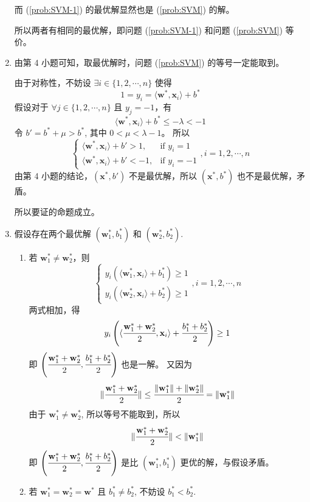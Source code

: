 \documentclass[11pt,letter,notitlepage]{article}
\begin{document}
\begin{solution}
\begin{enumerate}
		      而 (\ref{prob:SVM-1}) 的最优解显然也是 (\ref{prob:SVM}) 的解。

		      所以两者有相同的最优解，即问题 (\ref{prob:SVM-1}) 和问题 (\ref{prob:SVM}) 等价。
		\item 由第 4 小题可知，取最优解时，问题 (\ref{prob:SVM}) 的等号一定能取到。

		      由于对称性，不妨设 $\exists i \in \{1,2,\cdots,n\}$ 使得
		      $$1=y_i=\langle \mathbf{w}^*, \mathbf{x}_i \rangle+b^*$$
		      假设对于 $\forall j \in \{1,2,\cdots,n\}$ 且 $y_j=-1$，有
		      $$\langle \mathbf{w}^*, \mathbf{x}_i \rangle+b^* \leq -\lambda < -1$$
		      令 $b'=b^*+\mu > b^*$, 其中 $0 <\mu<\lambda-1$。 所以
		      $$\begin{cases}
				      \langle \mathbf{w}^*, \mathbf{x}_i \rangle+b' >1 , & \text{if $y_i=1$}  \\
				      \langle \mathbf{w}^*, \mathbf{x}_i \rangle+b' <-1, & \text{if $y_i=-1$}
			      \end{cases}, i=1,2,\cdots,n$$
		      由第 4 小题的结论，$(\mathbf{x}^*,b')$ 不是最优解，所以 $(\mathbf{x}^*,b^*)$ 也不是最优解，矛盾。

		      所以要证的命题成立。
		\item 假设存在两个最优解 $(\mathbf{w}^*_1,b^*_1)$ 和 $(\mathbf{w}^*_2,b^*_2)$.
		      \begin{enumerate}
			      \item 若 $\mathbf{w}_1^* \neq \mathbf{w}_2^*$，则
			            $$\begin{cases}
					            y_i(\langle \mathbf{w}^*_1, \mathbf{x}_i \rangle+b^*_1) \geq 1 \\
					            y_i(\langle \mathbf{w}^*_2, \mathbf{x}_i \rangle+b^*_2) \geq 1
				            \end{cases}, i=1,2,\cdots,n$$
			            两式相加，得
			            $$ y_i \left(\langle \cfrac{\mathbf{w}^*_1+\mathbf{w}^*_2}{2}, \mathbf{x}_i \rangle + \cfrac{b^*_1+b^*_2}{2} \right) \geq 1$$
			            即 $\left( \cfrac{\mathbf{w}^*_1+\mathbf{w}^*_2}{2}, \cfrac{b^*_1+b^*_2}{2} \right)$ 也是一解。
			            又因为
			            $$\|\cfrac{\mathbf{w}^*_1+\mathbf{w}^*_2}{2}\| \leq \cfrac{\|\mathbf{w}^*_1\| + \|\mathbf{w}^*_2\|}{2} = \|\mathbf{w}^*_1\|$$
			            由于 $\mathbf{w}^*_1 \neq \mathbf{w}^*_2$, 所以等号不能取到，所以
			            $$\|\cfrac{\mathbf{w}^*_1+\mathbf{w}^*_2}{2}\| < \|\mathbf{w}^*_1\|$$
			            即 $\left( \cfrac{\mathbf{w}^*_1+\mathbf{w}^*_2}{2}, \cfrac{b^*_1+b^*_2}{2} \right)$ 是比 $( \mathbf{w}^*_1, b_1^*)$ 更优的解，与假设矛盾。
			      \item 若 $\mathbf{w}_1^* = \mathbf{w}_2^* = \mathbf{w}^*$ 且 $b_1^* \neq b_2^*$, 不妨设 $b_1^* < b_2^*$.


\end{enumerate}
\end{enumerate}
\end{solution}
\end{document}
